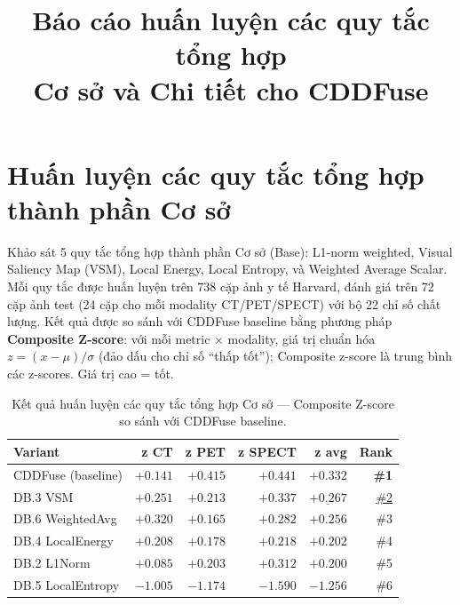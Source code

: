 \documentclass[12pt,a4paper]{article}
\title{Báo cáo huấn luyện các quy tắc tổng hợp\\Cơ sở và Chi tiết cho CDDFuse}
\author{}
\date{}
\begin{document}
\maketitle

\section{Huấn luyện các quy tắc tổng hợp thành phần Cơ sở}

Khảo sát 5 quy tắc tổng hợp thành phần Cơ sở (Base): L1-norm weighted, Visual Saliency Map (VSM), Local Energy, Local Entropy, và Weighted Average Scalar. Mỗi quy tắc được huấn luyện trên 738 cặp ảnh y tế Harvard, đánh giá trên 72 cặp ảnh test (24 cặp cho mỗi modality CT/PET/SPECT) với bộ 22 chỉ số chất lượng. Kết quả được so sánh với CDDFuse baseline bằng phương pháp \textbf{Composite Z-score}: với mỗi metric $\times$ modality, giá trị chuẩn hóa $z = (x - \mu) / \sigma$ (đảo dấu cho chỉ số ``thấp tốt''); Composite z-score là trung bình các z-scores. Giá trị cao = tốt.

\begin{table}[h]
\centering
\small
\setlength{\tabcolsep}{5pt}
\caption{Kết quả huấn luyện các quy tắc tổng hợp Cơ sở --- Composite Z-score so sánh với CDDFuse baseline.}
\begin{tabular}{lrrrrr}
\toprule
\textbf{Variant} & \textbf{z CT} & \textbf{z PET} & \textbf{z SPECT} & \textbf{z avg} & \textbf{Rank} \\
\midrule
CDDFuse (baseline)       & $+0.141$ & $+0.415$ & $+0.441$ & $\mathbf{+0.332}$ & \textbf{\#1} \\
DB.3 VSM                 & $+0.251$ & $+0.213$ & $+0.337$ & $\underline{+0.267}$ & \underline{\#2} \\
DB.6 WeightedAvg         & $+0.320$ & $+0.165$ & $+0.282$ & $+0.256$ & \#3 \\
DB.4 LocalEnergy         & $+0.208$ & $+0.178$ & $+0.218$ & $+0.202$ & \#4 \\
DB.2 L1Norm              & $+0.085$ & $+0.203$ & $+0.312$ & $+0.200$ & \#5 \\
DB.5 LocalEntropy        & $-1.005$ & $-1.174$ & $-1.590$ & $-1.256$ & \#6 \\
\bottomrule
\end{tabular}
\end{table}
\end{document}
